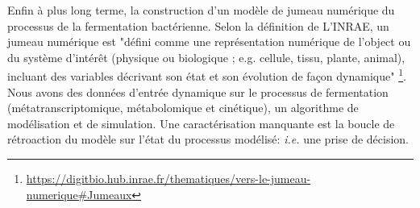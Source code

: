 \documentclass[../main.tex]{subfiles}
\begin{document}
Enfin à plus long terme, la construction d'un modèle de jumeau numérique du processus de la fermentation bactérienne. Selon la définition de L'INRAE, un jumeau numérique est "défini comme une représentation numérique de l'object ou du système d'intérêt  (physique ou biologique ; e.g. cellule, tissu, plante, animal), incluant des variables décrivant son état et son évolution de façon dynamique" \footnote{\url{https://digitbio.hub.inrae.fr/thematiques/vers-le-jumeau-numerique\#Jumeaux}}. Nous avons des données d'entrée dynamique sur le processus de fermentation (métatranscriptomique, métabolomique et cinétique), un algorithme de modélisation et de simulation. Une caractérisation manquante est la boucle de rétroaction du modèle sur l'état du processus modélisé: \textit{i.e.} une prise de décision.
\end{document}
